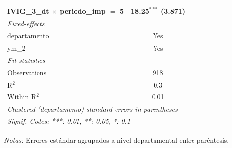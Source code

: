 \documentclass[12pt]{article}
\begin{document}
\begin{table}[htbp]
\begin{threeparttable}
\begin{tabular}{lc}
      IVIG\_3\_dt $\times$ periodo\_imp $=$ 5       & 18.25$^{***}$ (3.871)\\   
      \midrule
      \emph{Fixed-effects}\\
      departamento                                  & Yes\\  
      ym\_2                                         & Yes\\  
      \midrule
      \emph{Fit statistics}\\
      Observations                                  & 918\\  
      R$^2$                                         & 0.3\\  
      Within R$^2$                                  & 0.01\\  
      \midrule \midrule
      \multicolumn{2}{l}{\emph{Clustered (departamento) standard-errors in parentheses}}\\
      \multicolumn{2}{l}{\emph{Signif. Codes: ***: 0.01, **: 0.05, *: 0.1}}\\
   \end{tabular}


\begin{tablenotes}
\footnotesize
\item \textit{Notas:} Errores estándar agrupados a nivel departamental entre paréntesis.
\end{tablenotes}
\end{threeparttable}
\end{table}
\end{document}
